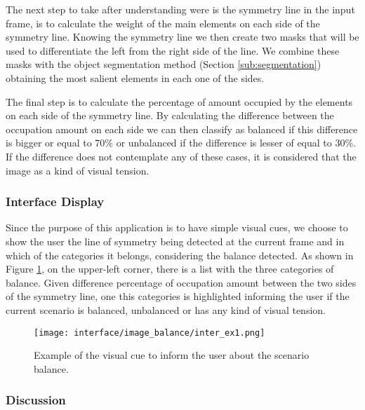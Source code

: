 \begin{description}
	The next step to take after understanding were is the symmetry line in the input frame, is to calculate the weight of the main elements on each side of the symmetry line. Knowing the symmetry line we then create two masks that will be used to differentiate the left from the right side of the line. We combine these masks with the object segmentation method (Section \ref{sub:segmentation}) obtaining the most salient elements in each one of the sides. 
	
	The final step is to calculate the percentage of amount occupied by the elements on each side of the symmetry line. By calculating the difference between the occupation amount on each side we can then classify as balanced if this difference is bigger or equal to 70\% or unbalanced if the difference is lesser of equal to 30\%. If the difference does not contemplate any of these cases, it is considered that the image as a kind of visual tension.
	
\end{description}

\subsubsection{Interface Display}

Since the purpose of this application is to have simple visual cues, we choose to show the user the line of symmetry being detected at the current frame and in which of the categories it belongs, considering the balance detected. As shown in Figure \ref{fig:balance_inter}, on the upper-left corner, there is a list with the three categories of balance. Given difference percentage of occupation amount between the two sides of the symmetry line, one this categories is highlighted informing the user if the current scenario is balanced, unbalanced or has any kind of visual tension.

\begin{figure}[htbp]
	\centering	
	\texttt{[image: interface/image\_balance/inter\_ex1.png]}
    \caption{Example of the visual cue to inform the user about the scenario balance.}
    \label{fig:balance_inter}
\end{figure}

\subsubsection{Discussion}


